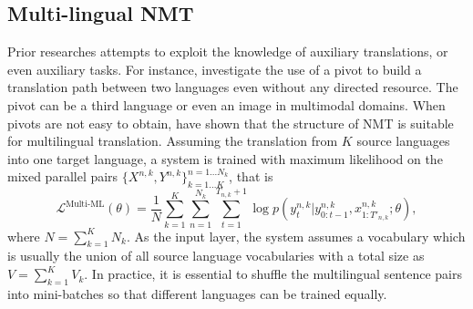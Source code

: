 \subsection{Multi-lingual NMT}
Prior researches attempts to exploit the knowledge of auxiliary translations, or even auxiliary tasks. For instance, \citet{cheng2016neural,chen2017teacher,lee2017emergent,chen2018zero} investigate the use of a pivot to build a translation path between two languages even without any directed resource. The pivot can be a third language or even an image in multimodal domains. When pivots are not easy to obtain, \citet{firat2016multi,lee2016fully,johnson2016google} have shown that the structure of NMT is suitable for multilingual translation. %
Assuming the translation from $K$ source languages into one target language, a  system is trained with maximum likelihood on the mixed parallel pairs $\{X^{n, k}, Y^{n, k}\}_{k=1 ... K}^{n=1 ... N_k}$, that is
\begin{equation}
	\mathcal{L}^{\text{Multi-ML}}\left(\theta\right)=\frac{1}{N}\sum_{k=1}^{K}\sum_{n=1}^{N_k} \sum_{t=1}^{T_{n, k}+1} \log p(y_t^{n,k}| y_{0:t-1}^{n,k}, x_{1:T'_{n,k}}^{n,k}; \theta),
\end{equation}
where $N=\sum_{k=1}^K N_k$. As the input layer, the system assumes a vocabulary which is usually the union of all  source language vocabularies with a total size as $V=\sum_{k=1}^K V_k$. In practice, it is essential to shuffle the multilingual sentence pairs into mini-batches so that different languages can be trained equally.

